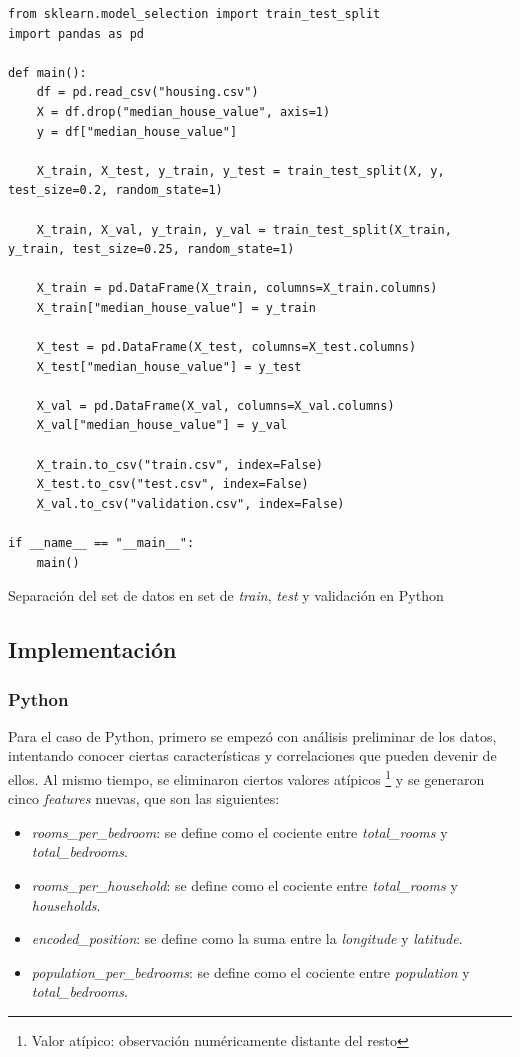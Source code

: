 \documentclass[11pt]{article}
\let\Oldsubsection\subsection
\renewcommand{\subsection}{\FloatBarrier\Oldsubsection}
\let\Oldsubsubsection\subsubsection
\renewcommand{\subsubsection}{\FloatBarrier\Oldsubsubsection}
\newcommand{\english}[1]{\textit{#1}}
\begin{document}
\begin{listing}[h]
\begin{verbatim}
from sklearn.model_selection import train_test_split
import pandas as pd

def main():
    df = pd.read_csv("housing.csv")
    X = df.drop("median_house_value", axis=1)
    y = df["median_house_value"]

    X_train, X_test, y_train, y_test = train_test_split(X, y, test_size=0.2, random_state=1)
    
    X_train, X_val, y_train, y_val = train_test_split(X_train, y_train, test_size=0.25, random_state=1)
    
    X_train = pd.DataFrame(X_train, columns=X_train.columns)
    X_train["median_house_value"] = y_train
    
    X_test = pd.DataFrame(X_test, columns=X_test.columns)
    X_test["median_house_value"] = y_test
    
    X_val = pd.DataFrame(X_val, columns=X_val.columns)
    X_val["median_house_value"] = y_val
    
    X_train.to_csv("train.csv", index=False)
    X_test.to_csv("test.csv", index=False)
    X_val.to_csv("validation.csv", index=False)

if __name__ == "__main__":
    main()
\end{verbatim}
\caption{Separación del set de datos en set de \english{train}, \english{test} y validación en Python}
\label{code:nn:python_split_train_test_set}
\end{listing}


\subsection{Implementación}

\subsubsection{Python}

Para el caso de Python, primero se empezó con análisis preliminar de los datos, intentando conocer ciertas características y correlaciones que pueden devenir de ellos. Al mismo tiempo, se eliminaron ciertos valores atípicos \footnote{Valor atípico: observación numéricamente distante del resto} y se generaron cinco \english{features} nuevas, que son las siguientes:

\begin{itemize}
    \item \english{rooms\_per\_bedroom}: se define como el cociente entre \english{total\_rooms} y \english{total\_bedrooms}.
    \item \english{rooms\_per\_household}: se define como el cociente entre \english{total\_rooms} y \english{households}.
    \item \english{encoded\_position}: se define como la suma entre la \english{longitude} y \english{latitude}.
    \item \english{population\_per\_bedrooms}: se define como el cociente entre \english{population} y \english{total\_bedrooms}.
\end{itemize}
\end{document}
